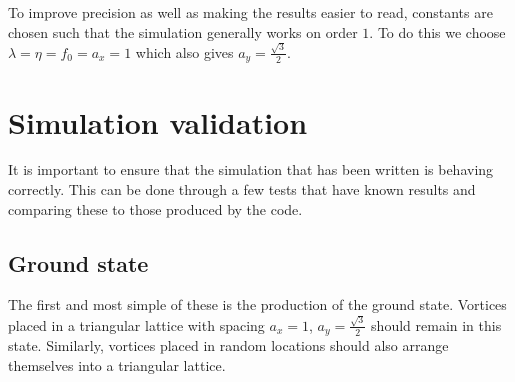 \documentclass{article}
\numberwithin{equation}{section}
\begin{document}
To improve precision as well as making the results easier to read, constants are chosen such that the simulation generally works on order $1$. To do this we choose $\lambda = \eta = f_0 = a_x = 1$ which also gives $a_y = \frac{\sqrt{3}}{2}$.

\section{Simulation validation}
It is important to ensure that the simulation that has been written is behaving correctly. This can be done through a few tests that have known results and comparing these to those produced by the code.
\subsection{Ground state}
The first and most simple of these is the production of the ground state. Vortices placed in a triangular lattice with spacing $a_x=1$, $a_y=\frac{\sqrt{3}}{2}$ should remain in this state. Similarly, vortices placed in random locations should also arrange themselves into a triangular lattice.
\end{document}
